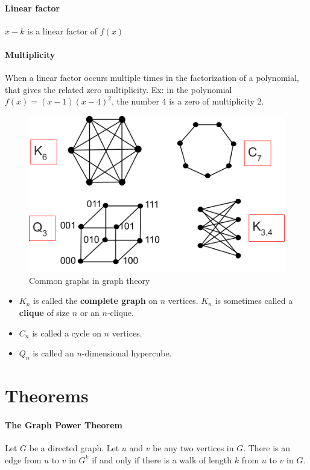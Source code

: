 \documentclass[a4paper]{article}
\begin{document}
\paragraph{Linear factor} $x - k$ is a linear factor of $f(x)$
\paragraph{Multiplicity} When a linear factor occurs multiple times in the factorization of a polynomial, that gives the related zero multiplicity. Ex: in the polynomial $f(x) = (x-1)(x-4)^2$, the number 4 is a zero of multiplicity 2.
\pagebreak
\begin{figure}
  \caption{Common graphs in graph theory}
  \includegraphics[width=6.5in]{common-graphs.png}
\end{figure}
\begin{itemize}
  \item $K_n$ is called the \textbf{complete graph} on $n$ vertices. $K_n$ is sometimes called a \textbf{clique} of size $n$ or an $n$-clique.
  \item $C_n$ is called a cycle on $n$ vertices.
  \item $Q_n$ is called an $n$-dimensional hypercube.
\end{itemize}
\pagebreak
\section{Theorems}
\paragraph{The Graph Power Theorem}
  Let $G$ be a directed graph. Let $u$ and $v$ be any two vertices in $G$. There is an edge from $u$ to $v$ in $G^k$ if and only if there is a walk of length $k$ from $u$ to $v$ in $G$.
\end{document}
